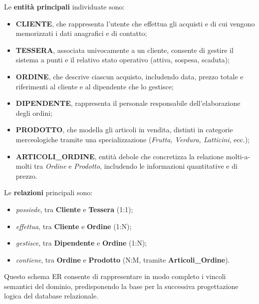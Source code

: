 \documentclass[a4paper,12pt]{article}
\begin{document}
Le \textbf{entità principali} individuate sono:
\begin{itemize}
    \item \textbf{CLIENTE}, che rappresenta l’utente che effettua gli acquisti e di cui vengono memorizzati i dati anagrafici e di contatto;
    \item \textbf{TESSERA}, associata univocamente a un cliente, consente di gestire il sistema a punti e il relativo stato operativo (attiva, sospesa, scaduta);
    \item \textbf{ORDINE}, che descrive ciascun acquisto, includendo data, prezzo totale e riferimenti al cliente e al dipendente che lo gestisce;
    \item \textbf{DIPENDENTE}, rappresenta il personale responsabile dell’elaborazione degli ordini;
    \item \textbf{PRODOTTO}, che modella gli articoli in vendita, distinti in categorie merceologiche tramite una specializzazione (\emph{Frutta, Verdura, Latticini}, ecc.);
    \item \textbf{ARTICOLI\_ORDINE}, entità debole che concretizza la relazione molti-a-molti tra \emph{Ordine} e \emph{Prodotto}, includendo le informazioni quantitative e di prezzo.
\end{itemize}

Le \textbf{relazioni} principali sono:
\begin{itemize}
    \item \emph{possiede}, tra \textbf{Cliente} e \textbf{Tessera} (1:1);
    \item \emph{effettua}, tra \textbf{Cliente} e \textbf{Ordine} (1:N);
    \item \emph{gestisce}, tra \textbf{Dipendente} e \textbf{Ordine} (1:N);
    \item \emph{contiene}, tra \textbf{Ordine} e \textbf{Prodotto} (N:M, tramite \textbf{Articoli\_Ordine}).
\end{itemize}

Questo schema ER consente di rappresentare in modo completo i vincoli semantici del dominio, predisponendo la base per la successiva progettazione logica del database relazionale.
\end{document}
